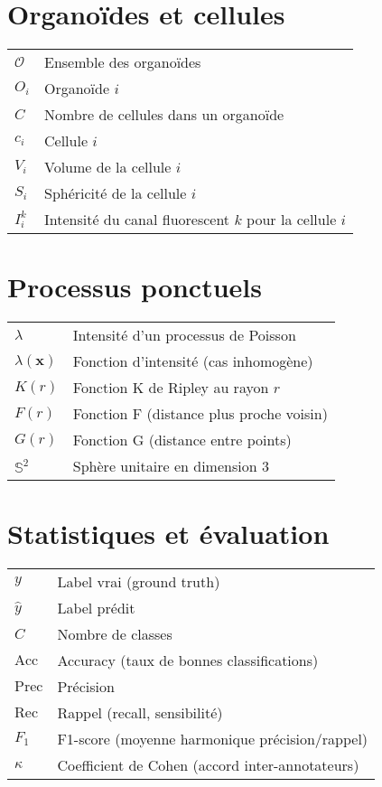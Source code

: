 \section*{Organoïdes et cellules}

\begin{tabular}{p{2.5cm} p{11cm}}
  \hline
  $\mathcal{O}$ & Ensemble des organoïdes\\
  $O_i$ & Organoïde $i$\\
  $C$ & Nombre de cellules dans un organoïde\\
  $c_i$ & Cellule $i$\\
  $V_i$ & Volume de la cellule $i$\\
  $S_i$ & Sphéricité de la cellule $i$\\
  $I_i^k$ & Intensité du canal fluorescent $k$ pour la cellule $i$\\
  \hline
\end{tabular}

\section*{Processus ponctuels}

\begin{tabular}{p{2.5cm} p{11cm}}
  \hline
  $\lambda$ & Intensité d'un processus de Poisson\\
  $\lambda(\mathbf{x})$ & Fonction d'intensité (cas inhomogène)\\
  $K(r)$ & Fonction K de Ripley au rayon $r$\\
  $F(r)$ & Fonction F (distance plus proche voisin)\\
  $G(r)$ & Fonction G (distance entre points)\\
  $\mathbb{S}^2$ & Sphère unitaire en dimension 3\\
  \hline
\end{tabular}

\section*{Statistiques et évaluation}

\begin{tabular}{p{2.5cm} p{11cm}}
  \hline
  $y$ & Label vrai (ground truth)\\
  $\hat{y}$ & Label prédit\\
  $C$ & Nombre de classes\\
  $\text{Acc}$ & Accuracy (taux de bonnes classifications)\\
  $\text{Prec}$ & Précision\\
  $\text{Rec}$ & Rappel (recall, sensibilité)\\
  $F_1$ & F1-score (moyenne harmonique précision/rappel)\\
  $\kappa$ & Coefficient de Cohen (accord inter-annotateurs)\\
  \hline
\end{tabular}

